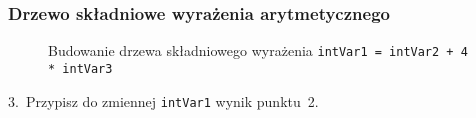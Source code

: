 \documentclass[10pt,t]{beamer}
\begin{document}
\begin{frame}
  \frametitle{Drzewo składniowe wyrażenia arytmetycznego}


  \begin{figure}


    \caption{Budowanie drzewa składniowego wyrażenia
      \texttt{intVar1 = intVar2 + 4 * intVar3}}

    \label{fig:Scheme-of-CPU}

  \end{figure}





  3.~Przypisz do zmiennej \texttt{intVar1} wynik punktu~2. \\

\end{frame}
\end{document}
